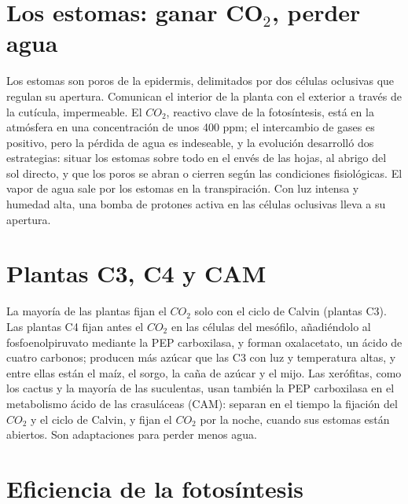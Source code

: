 \documentclass{book}
\begin{document}

\section{Los estomas: ganar CO\({}_{2}\), perder agua}

Los estomas son poros de la epidermis, delimitados por dos células oclusivas que regulan su apertura. Comunican el interior de la planta con el exterior a través de la cutícula, impermeable. El \(CO_{2}\), reactivo clave de la fotosíntesis, está en la atmósfera en una concentración de unos 400 ppm; el intercambio de gases es positivo, pero la pérdida de agua es indeseable, y la evolución desarrolló dos estrategias: situar los estomas sobre todo en el envés de las hojas, al abrigo del sol directo, y que los poros se abran o cierren según las condiciones fisiológicas. El vapor de agua sale por los estomas en la transpiración. Con luz intensa y humedad alta, una bomba de protones activa en las células oclusivas lleva a su apertura.


\section{Plantas C3, C4 y CAM}

La mayoría de las plantas fijan el \(CO_{2}\) solo con el ciclo de Calvin (plantas C3). Las plantas C4 fijan antes el \(CO_{2}\) en las células del mesófilo, añadiéndolo al fosfoenolpiruvato mediante la PEP carboxilasa, y forman oxalacetato, un ácido de cuatro carbonos; producen más azúcar que las C3 con luz y temperatura altas, y entre ellas están el maíz, el sorgo, la caña de azúcar y el mijo. Las xerófitas, como los cactus y la mayoría de las suculentas, usan también la PEP carboxilasa en el metabolismo ácido de las crasuláceas (CAM): separan en el tiempo la fijación del \(CO_{2}\) y el ciclo de Calvin, y fijan el \(CO_{2}\) por la noche, cuando sus estomas están abiertos. Son adaptaciones para perder menos agua.


\section{Eficiencia de la fotosíntesis}
\end{document}
